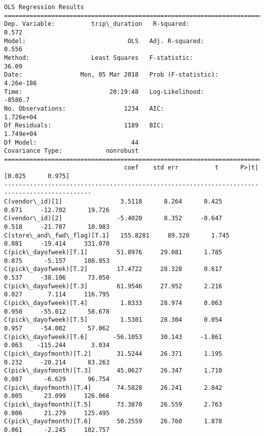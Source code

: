\documentclass[11pt]{article}
\begin{document}
    \begin{Verbatim}[commandchars=\\\{\}]
                            OLS Regression Results                            
==============================================================================
Dep. Variable:          trip\_duration   R-squared:                       0.572
Model:                            OLS   Adj. R-squared:                  0.556
Method:                 Least Squares   F-statistic:                     36.09
Date:                Mon, 05 Mar 2018   Prob (F-statistic):          4.26e-186
Time:                        20:19:48   Log-Likelihood:                -8586.7
No. Observations:                1234   AIC:                         1.726e+04
Df Residuals:                    1189   BIC:                         1.749e+04
Df Model:                          44                                         
Covariance Type:            nonrobust                                         
==============================================================================================
                                 coef    std err          t      P>|t|      [0.025      0.975]
----------------------------------------------------------------------------------------------
C(vendor\_id)[1]                3.5118      8.264      0.425      0.671     -12.702      19.726
C(vendor\_id)[2]               -5.4020      8.352     -0.647      0.518     -21.787      10.983
C(store\_and\_fwd\_flag)[T.1]   155.8281     89.320      1.745      0.081     -19.414     331.070
C(pick\_dayofweek)[T.1]        51.8976     29.081      1.785      0.075      -5.157     108.953
C(pick\_dayofweek)[T.2]        17.4722     28.328      0.617      0.537     -38.106      73.050
C(pick\_dayofweek)[T.3]        61.9546     27.952      2.216      0.027       7.114     116.795
C(pick\_dayofweek)[T.4]         1.8333     28.974      0.063      0.950     -55.012      58.678
C(pick\_dayofweek)[T.5]         1.5301     28.304      0.054      0.957     -54.002      57.062
C(pick\_dayofweek)[T.6]       -56.1053     30.143     -1.861      0.063    -115.244       3.034
C(pick\_dayofmonth)[T.2]       31.5244     26.371      1.195      0.232     -20.214      83.263
C(pick\_dayofmonth)[T.3]       45.0627     26.347      1.710      0.087      -6.629      96.754
C(pick\_dayofmonth)[T.4]       74.5828     26.241      2.842      0.005      23.099     126.066
C(pick\_dayofmonth)[T.5]       73.3870     26.559      2.763      0.006      21.279     125.495
C(pick\_dayofmonth)[T.6]       50.2559     26.760      1.878      0.061      -2.245     102.757

\end{Verbatim}
\end{document}
